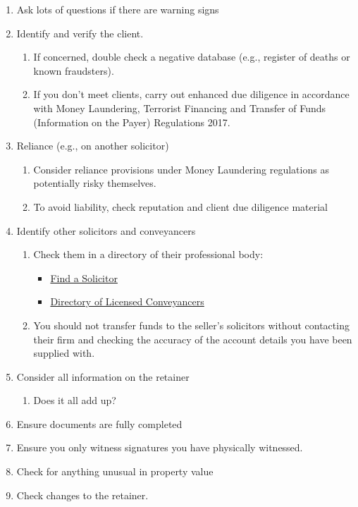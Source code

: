 \documentclass[
]{article}
\providecommand{\tightlist}{%
  \setlength{\itemsep}{0pt}\setlength{\parskip}{0pt}}
\begin{document}
\begin{enumerate}
\def\labelenumi{\arabic{enumi}.}
\tightlist
\item
  Ask lots of questions if there are warning signs
\item
  Identify and verify the client.

  \begin{enumerate}
  \def\labelenumii{\arabic{enumii}.}
  \tightlist
  \item
    If concerned, double check a negative database (e.g., register of
    deaths or known fraudsters).
  \item
    If you don't meet clients, carry out enhanced due diligence in
    accordance with Money Laundering, Terrorist Financing and Transfer
    of Funds (Information on the Payer) Regulations 2017.
  \end{enumerate}
\item
  Reliance (e.g., on another solicitor)

  \begin{enumerate}
  \def\labelenumii{\arabic{enumii}.}
  \tightlist
  \item
    Consider reliance provisions under Money Laundering regulations as
    potentially risky themselves.
  \item
    To avoid liability, check reputation and client due diligence
    material
  \end{enumerate}
\item
  Identify other solicitors and conveyancers

  \begin{enumerate}
  \def\labelenumii{\arabic{enumii}.}
  \tightlist
  \item
    Check them in a directory of their professional body:

    \begin{itemize}
    \tightlist
    \item
      \href{http://solicitors.lawsociety.org.uk/}{Find a Solicitor}
    \item
      \href{http://www.conveyancer.org.uk/CLC-Consumers/Find-a-Licensed-Conveyancer.aspx}{Directory
      of Licensed Conveyancers}
    \end{itemize}
  \item
    You should not transfer funds to the seller's solicitors without
    contacting their firm and checking the accuracy of the account
    details you have been supplied with.
  \end{enumerate}
\item
  Consider all information on the retainer

  \begin{enumerate}
  \def\labelenumii{\arabic{enumii}.}
  \tightlist
  \item
    Does it all add up?
  \end{enumerate}
\item
  Ensure documents are fully completed
\item
  Ensure you only witness signatures you have physically witnessed.
\item
  Check for anything unusual in property value
\item
  Check changes to the retainer.
\end{enumerate}
\end{document}
